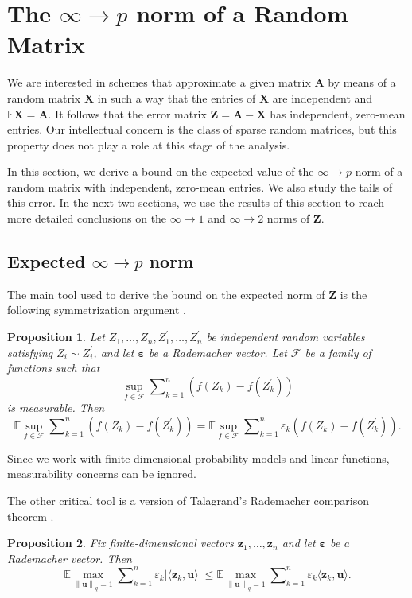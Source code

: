 \documentclass[11pt,letterpaper,twoside,reqno]{amsart}
\newcommand{\mat}[1]{\ensuremath{\bm{#1}}}
\newcommand{\E}{\ensuremath{\mathbb{E}}}
\newcommand{\supoverqball}{\ensuremath{\max_{\qnorm{\mat{u}} = 1}}}
\newcommand{\qnorm}[1]{\ensuremath{\left\|#1\right\|_q}}
\newcommand{\infone}{\ensuremath{\infty\!\rightarrow\!\!1}}
\newcommand{\inftwo}{\ensuremath{\infty\!\rightarrow\!\!2}}
\newcommand{\infp}{\ensuremath{\infty\!\rightarrow\!p}}
\newtheorem{prop}{Proposition}
\begin{document}
\section{The $\infp$ norm of a Random Matrix}
\label{sec:inftopbound}

We are interested in schemes that approximate a given matrix $\mat{A}$ by means of a random matrix $\mat{X}$ in such a way that the entries of $\mat{X}$ are independent and $\E\mat{X} = \mat{A}$. It follows that the error matrix $\mat{Z}=\mat{A}-\mat{X}$ has independent, zero-mean entries. Our intellectual concern is the class of sparse random matrices, but this property does not play a role at this stage of the analysis.

In this section, we derive a bound on the expected value of the $\infp$ norm of a random matrix with independent, zero-mean entries. We also study the tails of this error. In the next two sections, we use the results of this section to reach more detailed conclusions on the $\infone$ and $\inftwo$ norms of $\mat{Z}$.

\subsection{Expected $\infp$ norm} The main tool used to derive the bound on the expected norm of $\mat{Z}$ is the following symmetrization argument \cite[Lemma 2.3.1 et seq.]{vdVW}.

\begin{prop}
Let $Z_1, \ldots, Z_n, Z_1^\prime, \ldots, Z_n^\prime$ be independent random variables satisfying $Z_i \sim Z_i^\prime$, and let $\boldsymbol{\varepsilon}$ be a Rademacher vector. Let $\mathcal{F}$ be a family of functions such that 
\[
\sup_{f \in \mathcal{F}} \sum\nolimits_{k=1}^n (f(Z_k) - f(Z_k^\prime))
\]
is measurable. Then 
\[
\E \sup_{f \in \mathcal{F}} \sum\nolimits_{k=1}^n (f(Z_k) - f(Z_k^\prime)) = \E \sup_{f \in \mathcal{F}} \sum\nolimits_{k=1}^n \varepsilon_k (f(Z_k) - f(Z_k^\prime)).
\]
\label{prop:symmetrization}
\end{prop}
Since we work with finite-dimensional probability models and linear functions, measurability concerns can be ignored.

The other critical tool is a version of Talagrand's Rademacher comparison theorem \cite[Theorem 4.12 et seq.]{LT91}.

\begin{prop}
Fix finite-dimensional vectors $\mat{z}_{1},\ldots,\mat{z}_{n}$ and let
$\boldsymbol{\varepsilon}$ be a Rademacher vector. Then \[
\E\supoverqball\sum\nolimits_{k=1}^{n}\varepsilon_k|\langle\mat{z}_{k},\mat{u}\rangle|\leq\E\supoverqball\sum\nolimits_{k=1}^{n}\varepsilon_{k}\langle\mat{z}_{k},\mat{u}\rangle.\]
 \label{prop:comparison}
\end{prop}
\end{document}
